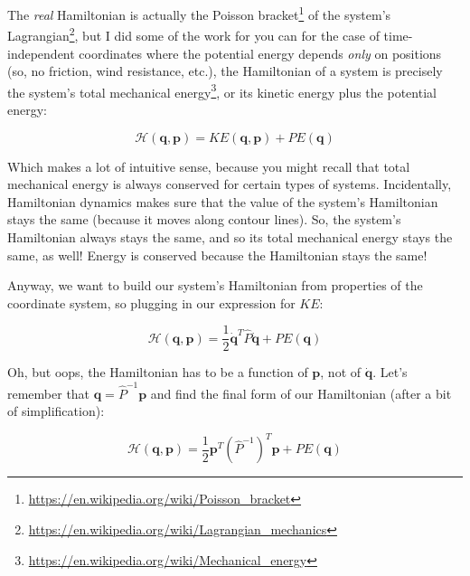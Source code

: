 \documentclass[]{article}
\renewcommand{\href}[2]{#2\footnote{\url{#1}}}
\begin{document}
The \emph{real} Hamiltonian is actually the
\href{https://en.wikipedia.org/wiki/Poisson_bracket}{Poisson bracket} of the
system's \href{https://en.wikipedia.org/wiki/Lagrangian_mechanics}{Lagrangian},
but I did some of the work for you can for the case of time-independent
coordinates where the potential energy depends \emph{only} on positions (so, no
friction, wind resistance, etc.), the Hamiltonian of a system is precisely the
system's total \href{https://en.wikipedia.org/wiki/Mechanical_energy}{mechanical
energy}, or its kinetic energy plus the potential energy:

\[
\mathcal{H}(\mathbf{q},\mathbf{p}) = KE(\mathbf{q},\mathbf{p}) + PE(\mathbf{q})
\]

Which makes a lot of intuitive sense, because you might recall that total
mechanical energy is always conserved for certain types of systems.
Incidentally, Hamiltonian dynamics makes sure that the value of the system's
Hamiltonian stays the same (because it moves along contour lines). So, the
system's Hamiltonian always stays the same, and so its total mechanical energy
stays the same, as well! Energy is conserved because the Hamiltonian stays the
same!

Anyway, we want to build our system's Hamiltonian from properties of the
coordinate system, so plugging in our expression for \(KE\):

\[
\mathcal{H}(\mathbf{q},\mathbf{p}) = \frac{1}{2} \dot{\mathbf{q}}^T \hat{P} \dot{\mathbf{q}} + PE(\mathbf{q})
\]

Oh, but oops, the Hamiltonian has to be a function of \(\mathbf{p}\), not of
\(\dot{\mathbf{q}}\). Let's remember that
\(\mathbf{q} = \hat{P}^{-1} \mathbf{p}\) and find the final form of our
Hamiltonian (after a bit of simplification):

\[
\mathcal{H}(\mathbf{q},\mathbf{p}) = \frac{1}{2} \mathbf{p}^T (\hat{P}^{-1})^T \mathbf{p} + PE(\mathbf{q})
\]
\end{document}
